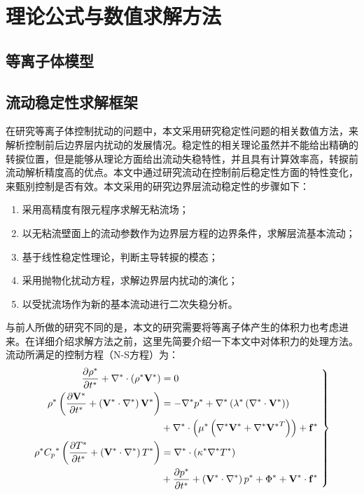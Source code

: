 \chapter{理论公式与数值求解方法}
\label{cha:2}
\section{等离子体模型}
\section{流动稳定性求解框架}
在研究等离子体控制扰动的问题中，本文采用研究稳定性问题的相关数值方法，来解析控制前后边界层内扰动的发展情况。稳定性的相关理论虽然并不能给出精确的转捩位置，但是能够从理论方面给出流动失稳特性，并且具有计算效率高，转捩前流动解析精度高的优点。本文中通过研究流动在控制前后稳定性方面的特性变化，来甄别控制是否有效。本文采用的研究边界层流动稳定性的步骤如下：
\begin{enumerate}
  \item 采用高精度有限元程序求解无粘流场；
  \item 以无粘流壁面上的流动参数作为边界层方程的边界条件，求解层流基本流动；
  \item 基于线性稳定性理论，判断主导转捩的模态；
  \item 采用抛物化扰动方程，求解边界层内扰动的演化；
  \item 以受扰流场作为新的基本流动进行二次失稳分析。
\end{enumerate}

与前人所做的研究不同的是，本文的研究需要将等离子体产生的体积力也考虑进来。在详细介绍求解方法之前，这里先简要介绍一下本文中对体积力的处理方法。流动所满足的控制方程（N-S方程）为：
\begin{equation}\label{EQ_NS}\left.
\begin{aligned}
    \frac{\partial{\rho^*}}{\partial{t^*}}
    + {\nabla^*}\cdot\left({\rho^*}{\mathbf{V}^*}\right) & =0
    \\
    {\rho^*}\left( {\frac{\partial{\mathbf{V}^*}}{\partial{t^*}}
    + \left( {{\mathbf{V}^*}\cdot{\nabla^*}}\right)
    {\mathbf{V}^*}} \right) & =
     - {\nabla^*}{p^*} + {\nabla^*}\left( {{\lambda ^*}\left( {{\nabla ^*} \cdot {\mathbf{V}^*}} \right)} \right) \\
    & + {\nabla ^*} \cdot \left( {{\mu ^*}\left( {{\nabla ^*}{\mathbf{V}^*} + {\nabla ^*}{\mathbf{V}^*}^T} \right)} \right) + \mathbf{f}^*
    \\
    {\rho ^*}{C_p}^*\left( {\frac{{\partial{T^*}}}{{\partial{t^*}}} + \left( {{{\mathbf{V}}^*} \cdot {\nabla ^*}} \right){T^*}} \right) & =
    {\nabla ^*} \cdot \left( {{\kappa ^*}{\nabla ^*}{T^*}} \right) \\
    & + \frac{{\partial{p^*}}}{{\partial{t^*}}} + \left( {{{\mathbf{V}}^*} \cdot {\nabla ^*}} \right){p^*} + {\Phi ^*} + \mathbf{V}^* \cdot \mathbf{f}^*
\end{aligned}~\right\}
\end{equation}

